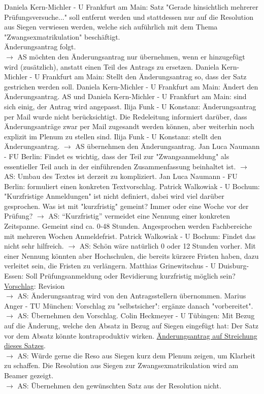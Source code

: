     \begin{outline}
      \1 Daniela Kern-Michler - U Frankfurt am Main:  Satz "Gerade hinsichtlich mehrerer Prüfungsversuche..." soll entfernt werden und stattdessen nur auf die Resolution aus Siegen verwiesen werden, welche sich auführlich mit dem Thema "Zwangsexmatrikulation" beschäftigt. \\ Änderungsantrag folgt. \\
      $\rightarrow$ AS möchten den Änderungsantrag nur übernehmen, wenn er hinzugefügt wird (zusätzlich), anstatt einen Teil des Antrags zu ersetzen.
        \2 Daniela Kern-Michler - U Frankfurt am Main:  Stellt den Änderungsantrag so, dass der Satz gestrichen werden soll.
        \2 Daniela Kern-Michler - U Frankfurt am Main:  Ändert den Änderungsantrag. AS und Daniela Kern-Michler - U Frankfurt am Main:  sind sich einig, der Antrag wird angepasst.
      \1 Ilija Funk - U Konstanz:  Änderungsantrag per Mail wurde nicht berücksichtigt.
        \2 Die Redeleitung informiert darüber, dass Änderungsanträge zwar per Mail zugesandt werden können, aber weiterhin noch explizit im Plenum zu stellen sind.
      \1 Ilija Funk - U Konstanz:  stellt den Änderungsantrag. $\rightarrow$ AS übernehmen den Änderungsantrag.
      \1 Jan Luca Naumann - FU Berlin:  Findet es wichtig, dass der Teil zur "Zwangsanmeldung" als essentieller Teil auch in der einführenden Zusammenfassung beinhaltet ist.
        $\rightarrow$ AS: Umbau des Textes ist derzeit zu kompliziert.
        \2 Jan Luca Naumann - FU Berlin:  formuliert einen konkreten Textvorschlag.
      \1 Patrick Walkowiak - U Bochum:  "Kurzfristige Anmeldungen" ist nicht definiert, dabei wird viel darüber gesprochen. Was ist mit "kurzfristig" gemeint? Immer oder eine Woche vor der Prüfung? $\rightarrow$ AS: ``Kurzfristig'' vermeidet eine Nennung einer konkreten Zeitspanne. Gemeint sind ca. 0-48 Stunden. Angesprochen werden Fachbereiche mit mehreren Wochen Anmeldefrist.
        \2 Patrick Walkowiak - U Bochum:  Findet das nicht sehr hilfreich.
          $\rightarrow$ AS: Schön wäre natürlich 0 oder 12 Stunden vorher. Mit einer Nennung könnten aber Hochschulen, die bereits kürzere Fristen haben, dazu verleitet sein, die Fristen zu verlängern.
      \1 Matthias Grinewitschus - U Duisburg-Essen:  Soll Prüfungsanmeldung oder Revidierung kurzfristig möglich sein? \underline{Vorschlag}: Revision \\
        $\rightarrow$ AS: Änderungsantrag wird von den Antragsstellern übernommen.
      \1 Marius Anger - TU München:  Vorschlag zu "selbstsicher": ergänze danach "vorbereitet". $\rightarrow$ AS: Übernehmen den Vorschlag.
      \1 Colin Heckmeyer - U Tübingen:  Mit Bezug auf die Änderung, welche den Absatz in Bezug auf Siegen eingefügt hat: Der Satz vor dem Absatz könnte kontraproduktiv wirken. \underline{Änderungsantrag auf Streichung dieses Satzes}. \\
      $\rightarrow$ AS: Würde gerne die Reso aus Siegen kurz dem Plenum zeigen, um Klarheit zu schaffen.
      \1 Die Resolution aus Siegen zur Zwangsexmatrikulation wird am Beamer gezeigt. \\
      $\rightarrow$ AS: Übernehmen den gewünschten Satz aus der Resolution nicht.
    \end{outline}

